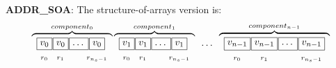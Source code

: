 \textbf{ADDR\_SOA}: The structure-of-arrays version is:
\[
\overbrace{
\begin{array}{cc} \boxed{v_0} \\  _{r_0} \end{array} \mkern-17mu
\begin{array}{cc} \boxed{v_0} \\  _{r_1} \end{array} \mkern-17mu
\begin{array}{cc} \boxed{\ldots\vphantom{v_0}} \\ \phantom{r_2}\end{array} \mkern-22mu
\begin{array}{cc} \boxed{v_0} \\  _{r_{n_s-1}} \end{array}
}^{component_0}
\overbrace{
\begin{array}{cc} \boxed{v_1} \\  _{r_0} \end{array} \mkern-17mu
\begin{array}{cc} \boxed{v_1} \\  _{r_1} \end{array} \mkern-17mu
\begin{array}{cc} \boxed{\ldots\vphantom{v_0}} \\ \phantom{r_2}\end{array} \mkern-22mu
\begin{array}{cc} \boxed{v_1} \\  _{r_{n_s-1}} \end{array}
}^{component_1}
\begin{array}{cc} \ldots \\ \phantom{r_2} \end{array}
\overbrace{
\begin{array}{cc} \boxed{v_{n-1}} \\  _{r_0} \end{array} \mkern-17mu
\begin{array}{cc} \boxed{v_{n-1}} \\  _{r_1} \end{array} \mkern-17mu
\begin{array}{cc} \boxed{\ldots\vphantom{v_{n-1}}} \\ \phantom{r_2}\end{array} \mkern-17mu
\begin{array}{cc} \boxed{v_{n-1}} \\  _{r_{n_s-1}} \end{array}
}^{component_{n-1}}
\]

